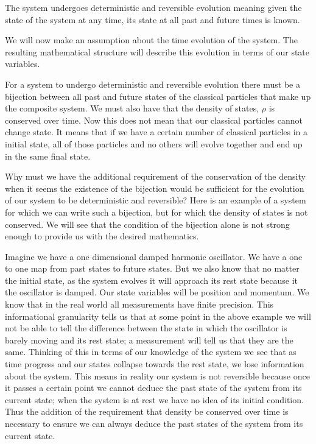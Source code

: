 \documentclass{article}
\begin{document}
\begin{assump}
	The system undergoes deterministic and reversible evolution meaning given the state of the system at any time, its state at all past and future times is known.
\end{assump}

	We will now make an assumption about the time evolution of the system. The resulting mathematical structure will describe this evolution in terms of our state variables.

	For a system to undergo deterministic and reversible evolution there must be a bijection between all past and future states of the classical particles that make up the composite system. We must also have that the density of states, $\rho$ is conserved over time. Now this does not mean that our classical particles cannot change state. It means that if we have a certain number of classical particles in a initial state, all of those particles and no others will evolve together and end up in the same final state.
	
	Why must we have the additional requirement of the conservation of the density when it seems the existence of the bijection would be sufficient for the evolution of our system to be deterministic and reversible? Here is an example of a system for which we can write such a bijection, but for which the density of states is not conserved. We will see that the condition of the bijection alone is not strong enough to provide us with the desired mathematics.
	
	Imagine we have a one dimensional damped harmonic oscillator. We have a one to one map from past states to future states. But we also know that no matter the initial state, as the system evolves it will approach its rest state because it the oscillator is damped. Our state variables will be position and momentum. We know that in the real world all measurements have finite precision. This informational granularity tells us that at some point in the above example we will not be able to tell the difference between the state in which the oscillator  is barely moving and its rest state; a measurement will tell us that they are the same. Thinking of this in terms of our knowledge of the system we see that as time progress and our states collapse towards the rest state, we lose information about the system. This means in reality our system is not reversible because once it passes a certain point we cannot deduce the past state of the system from its current state; when the system is at rest we have no idea of its initial condition. Thus the addition of the requirement that density be conserved over time is necessary to ensure we can always deduce the past states of the system from its current state.
	
\end{document}
